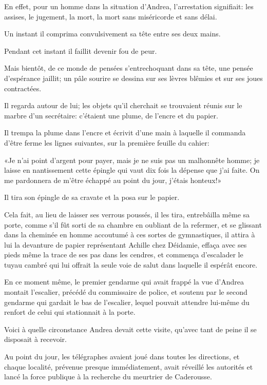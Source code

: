 En effet, pour un homme dans la situation d'Andrea, l'arrestation signifiait: les assises, le jugement, la mort, la mort sans miséricorde et sans délai. 

Un instant il comprima convulsivement sa tête entre ses deux mains. 

Pendant cet instant il faillit devenir fou de peur. 

Mais bientôt, de ce monde de pensées s'entrechoquant dans sa tête, une pensée d'espérance jaillit; un pâle sourire se dessina sur ses lèvres blêmies et sur ses joues contractées. 

Il regarda autour de lui; les objets qu'il cherchait se trouvaient réunis sur le marbre d'un secrétaire: c'étaient une plume, de l'encre et du papier. 

Il trempa la plume dans l'encre et écrivit d'une main à laquelle il commanda d'être ferme les lignes suivantes, sur la première feuille du cahier: 

«Je n'ai point d'argent pour payer, mais je ne suis pas un malhonnête homme; je laisse en nantissement cette épingle qui vaut dix fois la dépense que j'ai faite. On me pardonnera de m'être échappé au point du jour, j'étais honteux!» 

Il tira son épingle de sa cravate et la posa sur le papier. 

Cela fait, au lieu de laisser ses verrous poussés, il les tira, entrebâilla même sa porte, comme s'il fût sorti de sa chambre en oubliant de la refermer, et se glissant dans la cheminée en homme accoutumé à ces sortes de gymnastiques, il attira à lui la devanture de papier représentant Achille chez Déidamie, effaça avec ses pieds même la trace de ses pas dans les cendres, et commença d'escalader le tuyau cambré qui lui offrait la seule voie de salut dans laquelle il espérât encore. 

En ce moment même, le premier gendarme qui avait frappé la vue d'Andrea montait l'escalier, précédé du commissaire de police, et soutenu par le second gendarme qui gardait le bas de l'escalier, lequel pouvait attendre lui-même du renfort de celui qui stationnait à la porte. 

Voici à quelle circonstance Andrea devait cette visite, qu'avec tant de peine il se disposait à recevoir. 

Au point du jour, les télégraphes avaient joué dans toutes les directions, et chaque localité, prévenue presque immédiatement, avait réveillé les autorités et lancé la force publique à la recherche du meurtrier de Caderousse. 

